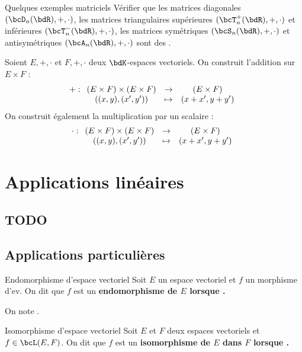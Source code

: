 \documentclass[a4paper,french,bookmarks]{article}
\begin{document}
\begin{exercise}{Quelques exemples matriciels}{}
    Vérifier que les matrices diagonales $(\bcD_n(\bdR), +, \cdot)$, les matrices triangulaires supérieures $(\bcT_n^+(\bdR), +, \cdot)$ et inférieures $(\bcT_n^-(\bdR), +, \cdot)$, les matrices symétriques $(\bcS_n(\bdR), +, \cdot)$ et antisymétriques $(\bcA_n(\bdR), +, \cdot)$ sont des .
\end{exercise}


Soient \(E, +, \cdot\) et \(F, +, \cdot\) deux $\bdK$-espaces vectoriels. On construit l'addition sur $E \times F$ :
%
\[ + : \begin{array}[t]{ccc}
    (E \times F) \times (E\times F) &\to& (E\times F)  \\
    \left((x, y), (x', y')\right) &\mapsto& (x + x', y + y') 
\end{array}\]
%
On construit également la multiplication par un scalaire :
%
\[ \cdot : \begin{array}[t]{ccc}
    (E \times F) \times (E\times F) &\to& (E\times F)  \\
    \left((x, y), (x', y')\right) &\mapsto& (x + x', y + y') 
\end{array}\]

\section{Applications linéaires}

\subsection{TODO}

\subsection{Applications particulières}

\begin{definition}{Endomorphisme d'espace vectoriel}{}
    Soit $E$ un espace vectoriel et $f$ un morphisme d'ev. On dit que $f$ est un \bf{endomorphisme de $E$} lorsque . 
    
    On note .
\end{definition}

\begin{definition}{Isomorphisme d'espace vectoriel}{}
    Soit $E$ et $F$ deux espaces vectoriels et $f \in \bcL(E, F)$. On dit que $f$ est un \bf{isomorphisme de $E$ dans $F$} lorsque .
\end{definition}
\end{document}
